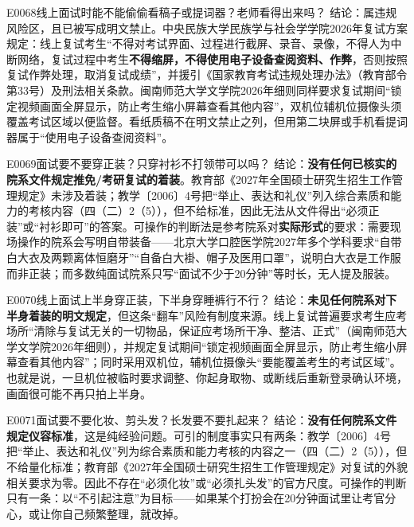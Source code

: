 \begin{qa}{E0068}{线上面试时能不能偷偷看稿子或提词器？老师看得出来吗？}
结论：属违规风险区，且已被写成明文禁止。中央民族大学民族学与社会学学院2026年复试方案规定：线上复试考生“不得对考试界面、过程进行截屏、录音、录像，不得人为中断网络，复试过程中考生\textbf{不得缩屏，不得使用电子设备查阅资料、作弊}，否则按照复试作弊处理，取消复试成绩”，并援引《国家教育考试违规处理办法》（教育部令第33号）及刑法相关条款。闽南师范大学文学院2026年细则同样要求复试期间“锁定视频画面全屏显示，防止考生缩小屏幕查看其他内容”，双机位辅机位摄像头须覆盖考试区域以便监督。看纸质稿不在明文禁止之列，但用第二块屏或手机看提词器属于“使用电子设备查阅资料”。
\end{qa}

\begin{qa}{E0069}{面试要不要穿正装？只穿衬衫不打领带可以吗？}
结论：\textbf{没有任何已核实的院系文件规定推免/考研复试的着装}。教育部《2027年全国硕士研究生招生工作管理规定》未涉及着装；教学〔2006〕4号把“举止、表达和礼仪”列入综合素质和能力的考核内容（四（二）2（5）），但不给标准，因此无法从文件得出“必须正装”或“衬衫即可”的答案。可操作的判断法是参考院系对\textbf{实际形式}的要求：需要现场操作的院系会写明自带装备——北京大学口腔医学院2027年多个学科要求“自带白大衣及两颗离体恒磨牙”“自备白大褂、帽子及医用口罩”，说明白大衣是工作服而非正装；而多数纯面试院系只写“面试不少于20分钟”等时长，无人提及服装。
\end{qa}

\begin{qa}{E0070}{线上面试上半身穿正装，下半身穿睡裤行不行？}
结论：\textbf{未见任何院系对下半身着装的明文规定}，但这条“翻车”风险有制度来源。线上复试普遍要求考生应考场所“清除与复试无关的一切物品，保证应考场所干净、整洁、正式”（闽南师范大学文学院2026年细则），并规定复试期间“锁定视频画面全屏显示，防止考生缩小屏幕查看其他内容”；同时采用双机位，辅机位摄像头“要能覆盖考生的考试区域”。也就是说，一旦机位被临时要求调整、你起身取物、或断线后重新登录确认环境，画面很可能不再只拍上半身。
\end{qa}

\begin{qa}{E0071}{面试要不要化妆、剪头发？长发要不要扎起来？}
结论：\textbf{没有任何院系文件规定仪容标准}，这是纯经验问题。可引的制度事实只有两条：教学〔2006〕4号把“举止、表达和礼仪”列为综合素质和能力考核的内容之一（四（二）2（5）），但不给量化标准；教育部《2027年全国硕士研究生招生工作管理规定》对复试的外貌相关要求为零。因此不存在“必须化妆”或“必须扎头发”的官方尺度。可操作的判断只有一条：以“不引起注意”为目标——如果某个打扮会在20分钟面试里让考官分心，或让你自己频繁整理，就改掉。
\end{qa}

